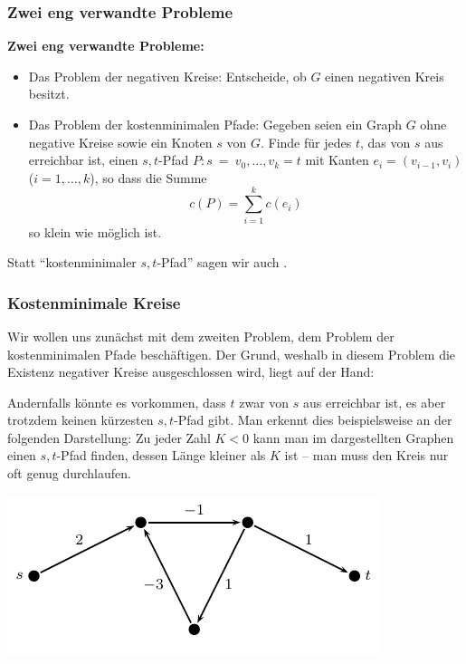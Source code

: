 \documentclass[smaller,xcolor=dvipsnames]{beamer}
\begin{document}
\begin{frame}
\frametitle{Zwei eng verwandte Probleme}
\textbf{Zwei eng verwandte Probleme:}
\begin{itemize}
\item \alert{Das Problem der negativen Kreise:} Entscheide, ob $G$ einen negativen Kreis besitzt.
\item \alert{Das Problem der kostenminimalen Pfade:} Gegeben seien ein Graph $G$ ohne negative Kreise sowie ein Knoten $s$ von $G$. Finde für jedes $t$, das von $s$ aus erreichbar ist, einen $s,t$-Pfad $P: s~=~v_0,\ldots,v_k=t$ mit Kanten $e_i=(v_{i-1},v_i)$ ($i=1,\ldots,k$), so dass die Summe
\[
c(P) = \sum\limits_{i=1}^k{c(e_i)}
\]
so klein wie möglich ist.
\end{itemize} \medskip

Statt \enquote{kostenminimaler $s,t$-Pfad} sagen wir auch .
\end{frame}

\begin{frame}
\frametitle{Kostenminimale Kreise}
 Wir wollen uns zunächst mit dem zweiten Problem, dem Problem der \alert{kostenminimalen Pfade} be\-schäf\-ti\-gen. Der Grund, weshalb in diesem Problem die Existenz negativer Kreise ausgeschlossen wird, liegt auf der Hand:
 \\ \medskip
 
 Andernfalls könnte es vorkommen, dass $t$ zwar von $s$ aus erreichbar ist, es aber trotzdem keinen kürzesten $s,t$-Pfad gibt. Man erkennt dies beispielsweise an der folgenden Darstellung: Zu jeder Zahl $K < 0$ kann man im dargestellten Graphen einen $s,t$-Pfad finden, dessen Länge kleiner als $K$ ist -- man muss den Kreis nur oft genug durchlaufen.

\begin{center}
\includegraphics{fig96.pdf}
\end{center}
\end{frame}
\end{document}

